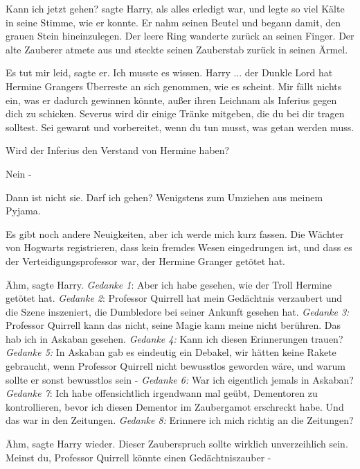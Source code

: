 \glqq{}Kann ich jetzt gehen?\grqq{} sagte Harry, als alles erledigt war, und
legte so viel Kälte in seine Stimme, wie er konnte. Er nahm seinen Beutel und
begann damit, den grauen Stein hineinzulegen. Der leere Ring wanderte zurück an
seinen Finger. Der alte Zauberer atmete aus und steckte seinen Zauberstab zurück
in seinen Ärmel.

\glqq{}Es tut mir leid\grqq{}, sagte er. \glqq{}Ich musste es wissen. Harry ...
der Dunkle Lord hat Hermine Grangers Überreste an sich genommen, wie es scheint.
Mir fällt nichts ein, was er dadurch gewinnen könnte, außer ihren Leichnam als
Inferius gegen dich zu schicken. Severus wird dir einige Tränke mitgeben, die du
bei dir tragen solltest. Sei gewarnt und vorbereitet, wenn du tun musst, was
getan werden muss.\grqq{}

\glqq{}Wird der Inferius den Verstand von Hermine haben?\grqq{}

\glqq{}Nein -\grqq{}

\glqq{}Dann ist nicht sie. Darf ich gehen? Wenigstens zum Umziehen aus meinem
Pyjama.\grqq{}

\glqq{}Es gibt noch andere Neuigkeiten, aber ich werde mich kurz fassen. Die
Wächter von Hogwarts registrieren, dass kein fremdes Wesen eingedrungen ist, und
dass es der Verteidigungsprofessor war, der Hermine Granger getötet hat.\grqq{}

\glqq{}Ähm\grqq{}, sagte Harry. \emph{Gedanke 1}: Aber ich habe gesehen, wie der
Troll Hermine getötet hat. \emph{Gedanke 2}: Professor Quirrell hat mein
Gedächtnis verzaubert und die Szene inszeniert, die Dumbledore bei seiner
Ankunft gesehen hat. \emph{Gedanke 3:} Professor Quirrell kann das nicht, seine
Magie kann meine nicht berühren. Das hab ich in Askaban gesehen. \emph{Gedanke
4:} Kann ich diesen Erinnerungen trauen? \emph{Gedanke 5:} In Askaban gab es
eindeutig ein Debakel, wir hätten keine Rakete gebraucht, wenn Professor
Quirrell nicht bewusstlos geworden wäre, und warum sollte er sonst bewusstlos
sein - \emph{Gedanke 6:} War ich eigentlich jemals in Askaban? \emph{Gedanke 7}:
Ich habe offensichtlich irgendwann mal geübt, Dementoren zu kontrollieren, bevor
ich diesen Dementor im Zaubergamot erschreckt habe. Und das war in den
Zeitungen. \emph{Gedanke 8:} Erinnere ich mich richtig an die Zeitungen?

\glqq{}Ähm\grqq{}, sagte Harry wieder. \glqq{}Dieser Zauberspruch sollte wirklich
unverzeihlich sein. Meinst du, Professor Quirrell könnte einen Gedächtniszauber
-\grqq{}

